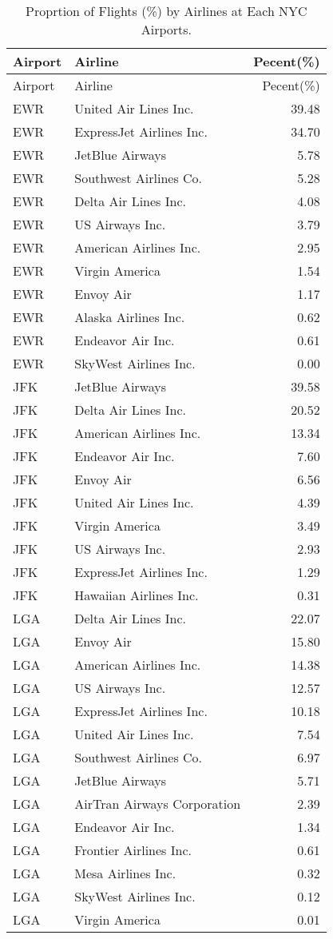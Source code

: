 \documentclass[]{article}
\begin{document}
\begin{longtable}[]{@{}llr@{}}
\caption{Proprtion of Flights (\%) by Airlines at Each NYC
Airports.}\tabularnewline
\toprule
Airport & Airline & Pecent(\%)\tabularnewline
\midrule
\endfirsthead
\toprule
Airport & Airline & Pecent(\%)\tabularnewline
\midrule
\endhead
EWR & United Air Lines Inc. & 39.48\tabularnewline
EWR & ExpressJet Airlines Inc. & 34.70\tabularnewline
EWR & JetBlue Airways & 5.78\tabularnewline
EWR & Southwest Airlines Co. & 5.28\tabularnewline
EWR & Delta Air Lines Inc. & 4.08\tabularnewline
EWR & US Airways Inc. & 3.79\tabularnewline
EWR & American Airlines Inc. & 2.95\tabularnewline
EWR & Virgin America & 1.54\tabularnewline
EWR & Envoy Air & 1.17\tabularnewline
EWR & Alaska Airlines Inc. & 0.62\tabularnewline
EWR & Endeavor Air Inc. & 0.61\tabularnewline
EWR & SkyWest Airlines Inc. & 0.00\tabularnewline
JFK & JetBlue Airways & 39.58\tabularnewline
JFK & Delta Air Lines Inc. & 20.52\tabularnewline
JFK & American Airlines Inc. & 13.34\tabularnewline
JFK & Endeavor Air Inc. & 7.60\tabularnewline
JFK & Envoy Air & 6.56\tabularnewline
JFK & United Air Lines Inc. & 4.39\tabularnewline
JFK & Virgin America & 3.49\tabularnewline
JFK & US Airways Inc. & 2.93\tabularnewline
JFK & ExpressJet Airlines Inc. & 1.29\tabularnewline
JFK & Hawaiian Airlines Inc. & 0.31\tabularnewline
LGA & Delta Air Lines Inc. & 22.07\tabularnewline
LGA & Envoy Air & 15.80\tabularnewline
LGA & American Airlines Inc. & 14.38\tabularnewline
LGA & US Airways Inc. & 12.57\tabularnewline
LGA & ExpressJet Airlines Inc. & 10.18\tabularnewline
LGA & United Air Lines Inc. & 7.54\tabularnewline
LGA & Southwest Airlines Co. & 6.97\tabularnewline
LGA & JetBlue Airways & 5.71\tabularnewline
LGA & AirTran Airways Corporation & 2.39\tabularnewline
LGA & Endeavor Air Inc. & 1.34\tabularnewline
LGA & Frontier Airlines Inc. & 0.61\tabularnewline
LGA & Mesa Airlines Inc. & 0.32\tabularnewline
LGA & SkyWest Airlines Inc. & 0.12\tabularnewline
LGA & Virgin America & 0.01\tabularnewline
\bottomrule
\end{longtable}
\end{document}
